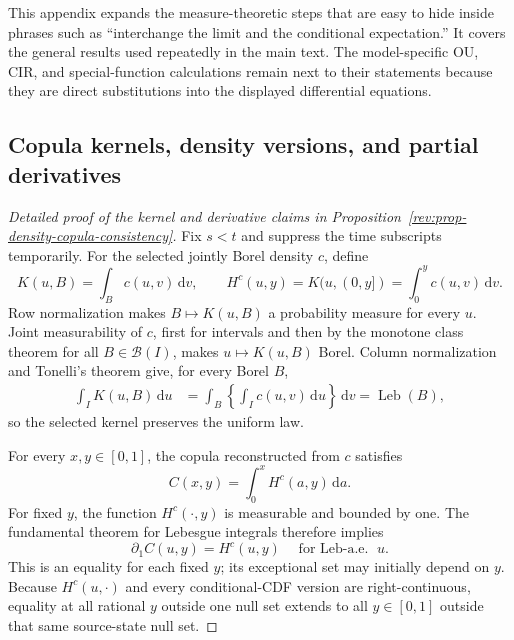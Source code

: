 \documentclass[11pt]{article}
\theoremstyle{remark}
\newcommand{\dd}{\,\mathrm d}
\newcommand{\Leb}{\operatorname{Leb}}
\begin{document}
This appendix expands the measure-theoretic steps that are easy to hide inside
phrases such as ``interchange the limit and the conditional expectation.''
It covers the general results used repeatedly in the main text.  The
model-specific OU, CIR, and special-function calculations remain next to their
statements because they are direct substitutions into the displayed
differential equations.

\subsection{Copula kernels, density versions, and partial derivatives}
\label{rev:app-copula-kernel-proof}

\begin{proof}[Detailed proof of the kernel and derivative claims in
Proposition~\ref{rev:prop-density-copula-consistency}]
Fix $s<t$ and suppress the time subscripts temporarily.  For the selected
jointly Borel density $c$, define
\[
K(u,B)=\int_Bc(u,v)\dd v,
\qquad
H^c(u,y)=K(u,(0,y])=\int_0^yc(u,v)\dd v.
\]
Row normalization makes $B\mapsto K(u,B)$ a probability measure for every
$u$.  Joint measurability of $c$, first for intervals and then by the monotone
class theorem for all $B\in\mathcal B(I)$, makes $u\mapsto K(u,B)$ Borel.
Column normalization and Tonelli's theorem give, for every Borel $B$,
\begin{align}
\int_IK(u,B)\dd u
&=\int_B\left\{\int_Ic(u,v)\dd u\right\}\dd v
=\Leb(B),
\label{rev:app-kernel-invariance}
\end{align}
so the selected kernel preserves the uniform law.

For every $x,y\in[0,1]$, the copula reconstructed from $c$ satisfies
\begin{equation}
C(x,y)=\int_0^xH^c(a,y)\dd a.
\label{rev:app-copula-kernel-reconstruction}
\end{equation}
For fixed $y$, the function $H^c(\cdot,y)$ is measurable and bounded by one.
The fundamental theorem for Lebesgue integrals therefore implies
\begin{equation}
\partial_1C(u,y)=H^c(u,y)
\quad\text{for $\Leb$-a.e. }u.
\label{rev:app-partial-from-kernel}
\end{equation}
This is an equality for each fixed $y$; its exceptional set may initially
depend on $y$.  Because $H^c(u,\cdot)$ and every conditional-CDF version are
right-continuous, equality at all rational $y$ outside one null set extends to
all $y\in[0,1]$ outside that same source-state null set.


\end{proof}
\end{document}
